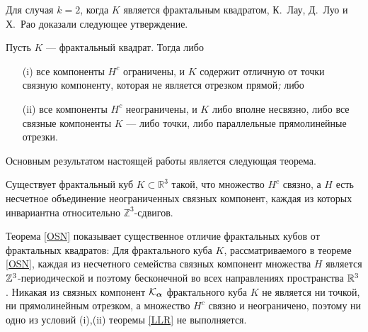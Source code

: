 Для случая $k=2$, когда $K$ является фрактальным квадратом, К.~Лау, Д.~Луо и Х.~Рао  доказали следующее утверждение.
\begin{theorem}\label{LLR}
Пусть $K$ --- фрактальный квадрат. Тогда  либо
\begin{itemize}[nolistsep]
\item[{\rm (i)}] все компоненты $H^c$  ограничены, и $K$ содержит отличную от точки связную компоненту, которая не является отрезком прямой\emph{;} либо
\item[{\rm (ii)}] все компоненты $H^c$  неограничены, и  $K$ либо вполне несвязно, либо все  связные компоненты $K$ --- либо точки, либо параллельные прямолинейные отрезки.
\end{itemize}
\end{theorem}

Основным результатом настоящей работы является следующая теорема.
\begin{theorem}\label{OSN}
Существует фрактальный куб  $K\subset \mathbb{R}^3$ такой, что множество $H^c$ связно, а $H$ есть несчетное объединение неограниченных связных компонент, каждая из которых инвариантна относительно $\mathbb{Z}^3$-сдвигов.
\end{theorem}

Теорема \ref{OSN} показывает существенное отличие фрактальных кубов от фрактальных квадратов:
Для фрактального куба $K$, рассматриваемого в теореме \ref{OSN}, каждая из несчетного семейства связных компонент множества $H$ является $\mathbb{Z}^3$-периодической и поэтому бесконечной во всех направлениях пространства $\mathbb{R}^3$. 
Никакая из связных компонент ${\mathcal K}_{\bm{\alpha}}$ фрактального куба $K$ не является ни точкой, ни прямолинейным отрезком, а множество $H^c$ связно и неограничено, поэтому ни одно из условий (i),(ii) теоремы \ref{LLR} не выполняется.

